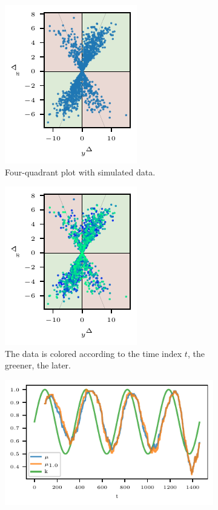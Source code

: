 \begin{figure}
    \centering
    \begin{subfigure}[t]{.24\textwidth}
\includegraphics{plots/illustrative_examples/4Q_sample_without_time}
\caption{Four-quadrant plot with simulated data.}\label{fig:trending_basic_4q_sample}
\end{subfigure}\hspace{0.01\textwidth}
\begin{subfigure}[t]{.24\textwidth}
\includegraphics{plots/illustrative_examples/4Q_sample_with_time}
\caption{The data is colored according to the time index $t$, the greener, the later.}\label{fig:trending_basic_4q_sample_color}
\end{subfigure}\hspace{0.01\textwidth}
\begin{subfigure}[t]{.48\textwidth}
    \includegraphics{plots/illustrative_examples/trending_ratio_time_series.pdf}

\end{subfigure}
\end{figure}
